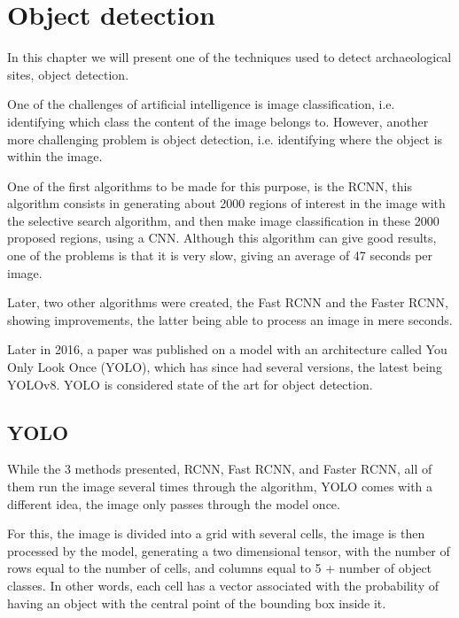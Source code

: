 

\chapter{Object detection}

\begin{introduction}
In this chapter we will present one of the techniques used to detect archaeological sites, object detection.
\end{introduction}

One of the challenges of artificial intelligence is image classification, i.e. identifying which class the content of the image belongs to. However, another more challenging problem is object detection, i.e. identifying where the object is within the image.

One of the first algorithms to be made for this purpose, is the RCNN, this algorithm consists in generating about 2000 regions of interest in the image with the selective search algorithm, and then make image classification in these 2000 proposed regions, using a CNN. Although this algorithm can give good results, one of the problems is that it is very slow, giving an average of 47 seconds per image. 

Later, two other algorithms were created, the Fast RCNN and the Faster RCNN, showing improvements, the latter being able to process an image in mere seconds.

Later in 2016, a paper was published on a model with an architecture called You Only Look Once (YOLO), which has since had several versions, the latest being YOLOv8.
YOLO is considered state of the art for object detection.




\section{YOLO}
While the 3 methods presented, RCNN, Fast RCNN, and Faster RCNN, all of them run the image several times through the algorithm, YOLO comes with a different idea, the image only passes through the model once.

For this, the image is divided into a grid\cite{yolodeepdive} with several cells, the image is then processed by the model, generating a two dimensional tensor, with the number of rows equal to the number of cells, and columns equal to 5 + number of object classes. In other words, each cell has a vector associated with the probability of having an object with the central point of the bounding box inside it.

